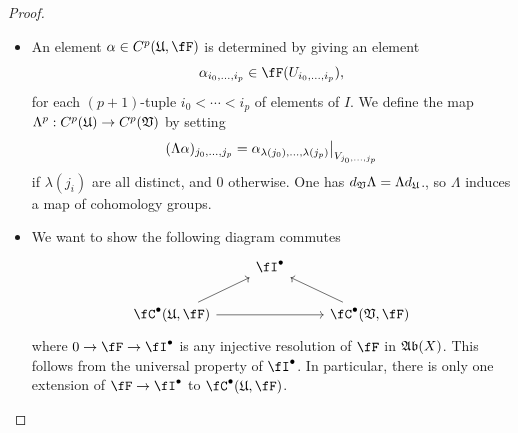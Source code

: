\documentclass[a4paper]{article}
\begin{document}
\begin{enumerate} [label=\textbf{\arabic*.}, leftmargin=0em]
        \begin{proof} $ $ \vspace{0pt}
          \begin{itemize} [leftmargin=0cm]
            \item[(a)] An element $\alpha \in C^p(\goth{U}, \fF)$ is determined by giving an element
                  \begin{equation*}
                    \alpha_{i_0, \dots, i_p} \in \fF(U_{i_0, \dots, i_p}),
                  \end{equation*}
                  for each $(p + 1)$-tuple $i_0 < \cdots < i_p$ of elements of $I$.
                  We define the map $\Lambda^p : C^p(\mathfrak{U}) \to C^p(\mathfrak{V})$ by setting
                  \begin{equation*}
                    (\Lambda \alpha)_{j_0, \dots, j_p} = \restr{\alpha_{\lambda(j_0), \dots, \lambda(j_p)}}{V_{j_0, \dots, j_p}}
                  \end{equation*}
                  if $\lambda(j_i)$ are all distinct, and $0$ otherwise.
                  One has $d_{\mathfrak{V}} \Lambda = \Lambda d_{\mathfrak{U}}$., so $\Lambda$ induces a map of cohomology groups.

            \item[(b)] We want to show the following diagram commutes
                  \[ \begin{tikzcd}
                      & \fI^\bullet &                                   \\
                      {\fC^\bullet(\goth{U}, \fF)} \arrow[rr] \arrow[ru] &             & {\fC^\bullet(\goth{V}, \fF)} \arrow[lu]
                    \end{tikzcd} \]
                  where $0 \to \fF \to \fI^\bullet$ is any injective resolution of $\fF$ in $\mathfrak{Ab}(X)$.
                  This follows from the universal property of $\fI^\bullet$.
                  In particular, there is only one extension of $\fF \to \fI^\bullet$ to $\fC^\bullet(\goth{U}, \fF)$.


\end{itemize}
\end{proof}
\end{enumerate}
\end{document}
